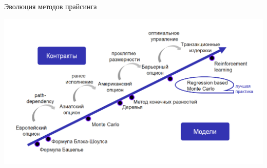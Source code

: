 \documentclass{beamer}
\begin{document}
\begin{frame}{Эволюция методов прайсинга}
    \begin{center}
        \includegraphics[width=1.0\textwidth]{0_figs/стрелочка.png}
    \end{center}
\end{frame}
\end{document}
